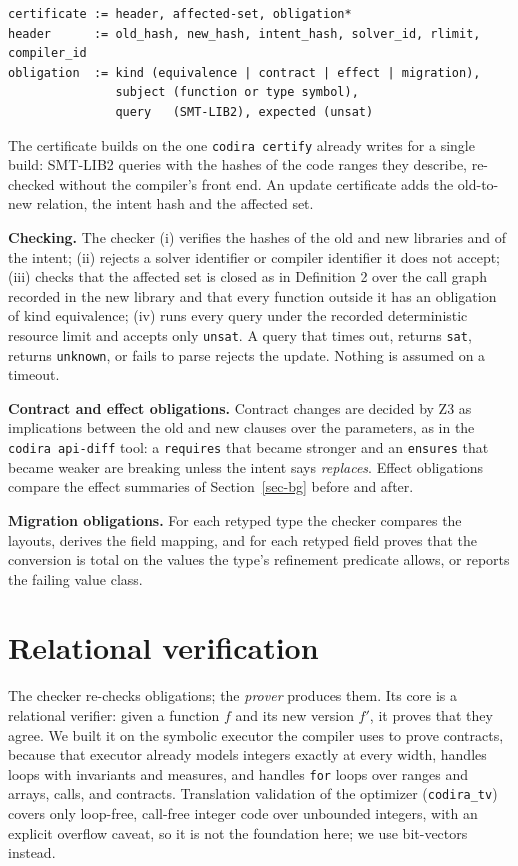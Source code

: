 \documentclass[10pt,twocolumn]{article}
\begin{document}
\begin{small}\begin{verbatim}
certificate := header, affected-set, obligation*
header      := old_hash, new_hash, intent_hash, solver_id, rlimit, compiler_id
obligation  := kind (equivalence | contract | effect | migration),
               subject (function or type symbol),
               query   (SMT-LIB2), expected (unsat)
\end{verbatim}\end{small}
The certificate builds on the one \texttt{codira certify} already writes for a single build: SMT-LIB2 queries with the hashes of the code ranges they describe, re-checked without the compiler's front end. An update certificate adds the old-to-new relation, the intent hash and the affected set.

\textbf{Checking.} The checker (i) verifies the hashes of the old and new libraries and of the intent; (ii) rejects a solver identifier or compiler identifier it does not accept; (iii) checks that the affected set is closed as in Definition 2 over the call graph recorded in the new library and that every function outside it has an obligation of kind equivalence; (iv) runs every query under the recorded deterministic resource limit and accepts only \texttt{unsat}. A query that times out, returns \texttt{sat}, returns \texttt{unknown}, or fails to parse rejects the update. Nothing is assumed on a timeout.

\textbf{Contract and effect obligations.} Contract changes are decided by Z3 as implications between the old and new clauses over the parameters, as in the \texttt{codira api-diff} tool: a \texttt{requires} that became stronger and an \texttt{ensures} that became weaker are breaking unless the intent says \emph{replaces}. Effect obligations compare the effect summaries of Section~\ref{sec-bg} before and after.

\textbf{Migration obligations.} For each retyped type the checker compares the layouts, derives the field mapping, and for each retyped field proves that the conversion is total on the values the type's refinement predicate allows, or reports the failing value class.

\section{Relational verification}\label{sec-rel}
The checker re-checks obligations; the \emph{prover} produces them. Its core is a relational verifier: given a function $f$ and its new version $f'$, it proves that they agree. We built it on the symbolic executor the compiler uses to prove contracts, because that executor already models integers exactly at every width, handles loops with invariants and measures, and handles \texttt{for} loops over ranges and arrays, calls, and contracts. Translation validation of the optimizer (\texttt{codira\_tv}) covers only loop-free, call-free integer code over unbounded integers, with an explicit overflow caveat, so it is not the foundation here; we use bit-vectors instead.
\end{document}
